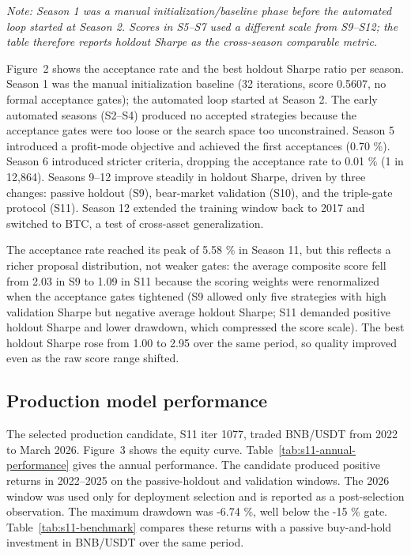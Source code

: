 \documentclass[11pt,a4paper]{article}
\begin{document}
\emph{Note: Season 1 was a manual initialization/baseline phase before the automated loop started at Season 2. Scores in S5--S7 used a different scale from S9--S12; the table therefore reports holdout Sharpe as the cross-season comparable metric.}

Figure~2 shows the acceptance rate and the best holdout Sharpe ratio per season. Season 1 was the manual initialization baseline (32 iterations, score 0.5607, no formal acceptance gates); the automated loop started at Season 2. The early automated seasons (S2--S4) produced no accepted strategies because the acceptance gates were too loose or the search space too unconstrained. Season 5 introduced a profit-mode objective and achieved the first acceptances (0.70 \%). Season 6 introduced stricter criteria, dropping the acceptance rate to 0.01 \% (1 in 12,864). Seasons 9--12 improve steadily in holdout Sharpe, driven by three changes: passive holdout (S9), bear-market validation (S10), and the triple-gate protocol (S11). Season 12 extended the training window back to 2017 and switched to BTC, a test of cross-asset generalization.

The acceptance rate reached its peak of 5.58 \% in Season 11, but this reflects a richer proposal distribution, not weaker gates: the average composite score fell from 2.03 in S9 to 1.09 in S11 because the scoring weights were renormalized when the acceptance gates tightened (S9 allowed only five strategies with high validation Sharpe but negative average holdout Sharpe; S11 demanded positive holdout Sharpe and lower drawdown, which compressed the score scale). The best holdout Sharpe rose from 1.00 to 2.95 over the same period, so quality improved even as the raw score range shifted.

\subsection{Production model performance}\label{production-model-performance}

The selected production candidate, S11 iter 1077, traded BNB/USDT from 2022 to March 2026. Figure~3 shows the equity curve. Table~\ref{tab:s11-annual-performance} gives the annual performance. The candidate produced positive returns in 2022--2025 on the passive-holdout and validation windows. The 2026 window was used only for deployment selection and is reported as a post-selection observation. The maximum drawdown was -6.74 \%, well below the -15 \% gate. Table~\ref{tab:s11-benchmark} compares these returns with a passive buy-and-hold investment in BNB/USDT over the same period.
\end{document}
